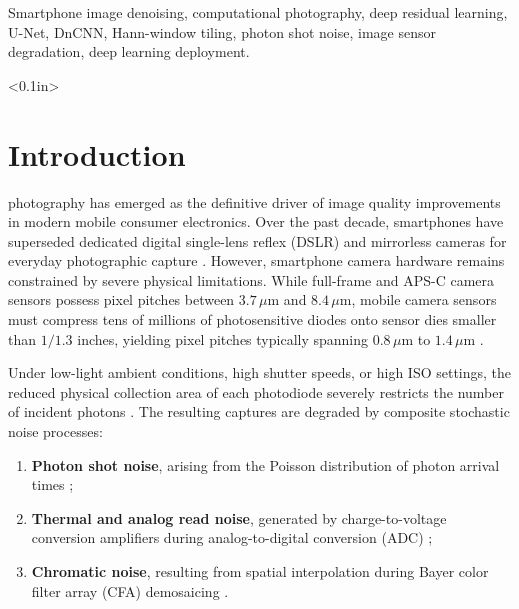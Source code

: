 \documentclass{ieeeaccess}
\begin{document}
\begin{keywords}
Smartphone image denoising, computational photography, deep residual learning, U-Net, DnCNN, Hann-window tiling, photon shot noise, image sensor degradation, deep learning deployment.
\end{keywords}

\titlepgskip<0.1in>

\maketitle

\section{Introduction}
\label{sec:introduction}
 photography has emerged as the definitive driver of image quality improvements in modern mobile consumer electronics. Over the past decade, smartphones have superseded dedicated digital single-lens reflex (DSLR) and mirrorless cameras for everyday photographic capture \cite{delbracio2021mobile}. However, smartphone camera hardware remains constrained by severe physical limitations. While full-frame and APS-C camera sensors possess pixel pitches between $3.7\,\mu\text{m}$ and $8.4\,\mu\text{m}$, mobile camera sensors must compress tens of millions of photosensitive diodes onto sensor dies smaller than $1/1.3$ inches, yielding pixel pitches typically spanning $0.8\,\mu\text{m}$ to $1.4\,\mu\text{m}$ \cite{barron2022mip}.

Under low-light ambient conditions, high shutter speeds, or high ISO settings, the reduced physical collection area of each photodiode severely restricts the number of incident photons \cite{hasinoff2016burst}. The resulting captures are degraded by composite stochastic noise processes:
\begin{enumerate}
    \item \textbf{Photon shot noise}, arising from the Poisson distribution of photon arrival times \cite{milanfar2013tour};
    \item \textbf{Thermal and analog read noise}, generated by charge-to-voltage conversion amplifiers during analog-to-digital conversion (ADC) \cite{healey1994radiometric};
    \item \textbf{Chromatic noise}, resulting from spatial interpolation during Bayer color filter array (CFA) demosaicing \cite{ramanath2002demosaicking}.
\end{enumerate}
\end{document}
